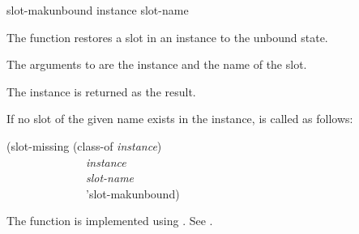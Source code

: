 \begin{defun}[Function]
slot-makunbound instance slot-name

The function  restores a slot in an instance to
the unbound state.





The arguments to  are the instance and the name of
the slot.


The instance is returned as the result.


If no slot of the given name exists in the instance, 
is called as follows:
\begin{lisp}
(slot-missing (class-of {\it instance\/}) \\
~~~~~~~~~~~~~~{\it instance\/} \\
~~~~~~~~~~~~~~{\it slot-name\/} \\
~~~~~~~~~~~~~~'slot-makunbound)
\end{lisp}

The function  is implemented using 
.
See .
\end{defun}



